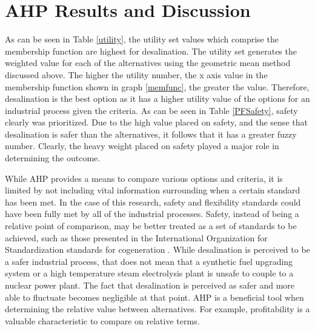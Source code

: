 \section{AHP Results and Discussion}
As can be seen in Table \ref{utility}, the utility set values which comprise the membership function are highest for desalination. The utility set generates the weighted value for each of the alternatives using the geometric mean method discussed above. The higher the utility number, the x axis value in the membership function shown in graph \ref{memfunc}, the greater the value. Therefore, desalination is the best option as it has a higher utility value of the options for an industrial process given the criteria. As can be seen in Table \ref{PFSafety}, safety clearly was prioritized.  Due to the high value placed on safety, and the sense that desalination is safer than the alternatives, it follows that it has a greater fuzzy number. Clearly, the heavy weight placed on safety played a major role in determining the outcome.

While AHP provides a means to compare various options and criteria, it is limited by not including vital information surrounding when a certain standard has been met. In the case of this research, safety and flexibility standards could have been fully met by all of the industrial processes. Safety, instead of being a relative point of comparison, may be better treated as a set of standards to be achieved, such as those presented in the International Organization for Standardization standards for cogeneration \cite{ISO2017}. While desalination is perceived to be a safer industrial process, that does not mean that a synthetic fuel upgrading system or a high temperature steam electrolysis plant is unsafe to couple to a nuclear power plant. The fact that desalination is perceived as safer and more able to fluctuate becomes negligible at that point. AHP is a beneficial tool when determining the relative value between alternatives.  For example, profitability is a valuable characteristic to compare on relative terms.

